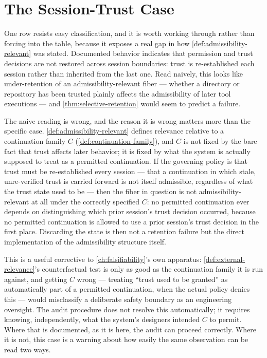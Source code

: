 \documentclass[11pt]{book}
\theoremstyle{plain}
\theoremstyle{definition}
\theoremstyle{remark}
\begin{document}
\section{The Session-Trust Case}
\label{sec:session-trust}

One row resists easy classification, and it is worth working through
rather than forcing into the table, because it exposes a real gap in
how \cref{def:admissibility-relevant} was stated. Documented behavior
indicates that permission and trust decisions are not restored across
session boundaries: trust is re-established each session rather than
inherited from the last one. Read naively, this looks like
under-retention of an admissibility-relevant fiber --- whether a
directory or repository has been trusted plainly affects the
admissibility of later tool executions --- and \cref{thm:selective-retention}
would seem to predict a failure.

The naive reading is wrong, and the reason it is wrong matters more
than the specific case. \cref{def:admissibility-relevant} defines
relevance relative to a continuation family $C$
(\cref{def:continuation-family}), and $C$ is not fixed by the bare
fact that trust affects later behavior; it is fixed by what the system
is actually supposed to treat as a permitted continuation. If the
governing policy is that trust must be re-established every session
--- that a continuation in which stale, unre-verified trust is carried
forward is not itself admissible, regardless of what the trust state
used to be --- then the fiber in question is not admissibility-relevant
at all under the correctly specified $C$: no permitted continuation
ever depends on distinguishing which prior session's trust decision
occurred, because no permitted continuation is allowed to use a prior
session's trust decision in the first place. Discarding the state is
then not a retention failure but the direct implementation of the
admissibility structure itself.

This is a useful corrective to \cref{ch:falsifiability}'s own
apparatus: \cref{def:external-relevance}'s counterfactual test is only
as good as the continuation family it is run against, and getting $C$
wrong --- treating \enquote{trust used to be granted} as automatically
part of a permitted continuation, when the actual policy denies this
--- would misclassify a deliberate safety boundary as an engineering
oversight. The audit procedure does not resolve this automatically; it
requires knowing, independently, what the system's designers intended
$C$ to permit. Where that is documented, as it is here, the audit can
proceed correctly. Where it is not, this case is a warning about how
easily the same observation can be read two ways.
\end{document}
